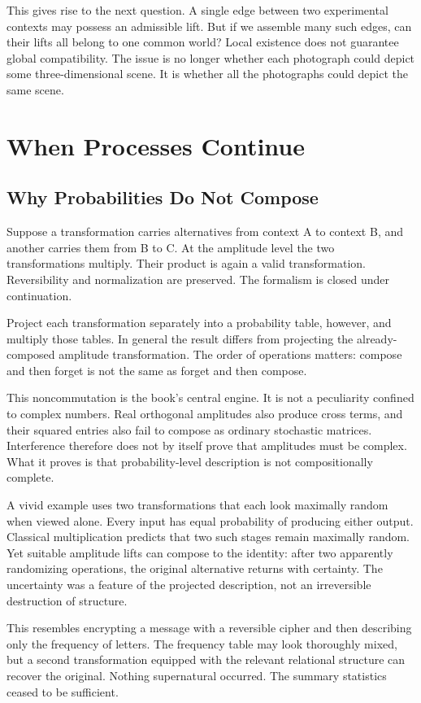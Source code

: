 \documentclass[12pt,openany]{book}
\begin{document}
This gives rise to the next question. A single edge between two experimental contexts may possess an admissible lift. But if we assemble many such edges, can their lifts all belong to one common world? Local existence does not guarantee global compatibility. The issue is no longer whether each photograph could depict some three-dimensional scene. It is whether all the photographs could depict the same scene.

\part{When Processes Continue}

\chapter{Why Probabilities Do Not Compose}
Suppose a transformation carries alternatives from context A to context B, and another carries them from B to C. At the amplitude level the two transformations multiply. Their product is again a valid transformation. Reversibility and normalization are preserved. The formalism is closed under continuation.

Project each transformation separately into a probability table, however, and multiply those tables. In general the result differs from projecting the already-composed amplitude transformation. The order of operations matters: compose and then forget is not the same as forget and then compose.

This noncommutation is the book's central engine. It is not a peculiarity confined to complex numbers. Real orthogonal amplitudes also produce cross terms, and their squared entries also fail to compose as ordinary stochastic matrices. Interference therefore does not by itself prove that amplitudes must be complex. What it proves is that probability-level description is not compositionally complete.

A vivid example uses two transformations that each look maximally random when viewed alone. Every input has equal probability of producing either output. Classical multiplication predicts that two such stages remain maximally random. Yet suitable amplitude lifts can compose to the identity: after two apparently randomizing operations, the original alternative returns with certainty. The uncertainty was a feature of the projected description, not an irreversible destruction of structure.

This resembles encrypting a message with a reversible cipher and then describing only the frequency of letters. The frequency table may look thoroughly mixed, but a second transformation equipped with the relevant relational structure can recover the original. Nothing supernatural occurred. The summary statistics ceased to be sufficient.
\end{document}
